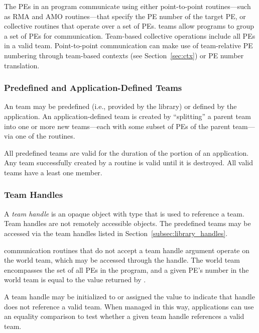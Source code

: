 The \acp{PE} in an \openshmem program communicate using either
point-to-point routines---such as \ac{RMA} and \ac{AMO} routines---that specify the \ac{PE} number of the target
\ac{PE}, or collective routines that operate over a set of \acp{PE}.
\openshmem teams allow programs to group a set of \acp{PE} for
communication.
Team-based collective operations include all \acp{PE}
in a valid team.
Point-to-point communication can make use of team-relative \ac{PE}
numbering through team-based contexts (see Section~\ref{sec:ctx}) or
\ac{PE} number translation.

\subsubsection*{Predefined and Application-Defined Teams}

An \openshmem team may be predefined (i.e., provided by the \openshmem
library) or defined by the \openshmem application.
An application-defined team is created by ``splitting'' a parent team into
one or more new teams---each with some subset of \acp{PE} of the
parent team---via one of the  routines.

All predefined teams are valid for the duration of the \openshmem
portion of an application.
Any team successfully created by a 
routine is valid until it is destroyed.
All valid teams have a least one member.

\subsubsection*{Team Handles}

A \emph{team handle} is an opaque object with type 
that is used to reference a team.
Team handles are not remotely accessible objects.
The predefined teams may be accessed via the team handles listed in
Section~\ref{subsec:library_handles}.

\openshmem communication routines that do not accept a team handle
argument operate on the world team, which may be accessed through
the  handle.
The world team encompasses the set of all \acp{PE} in the \openshmem
program, and a given \ac{PE}'s number in the world team is equal to the
value returned by .

A team handle may be initialized to or assigned the value
 to indicate that handle does not
reference a valid team.
When managed in this way, applications can use an equality comparison
to test whether a given team handle references a valid team.

